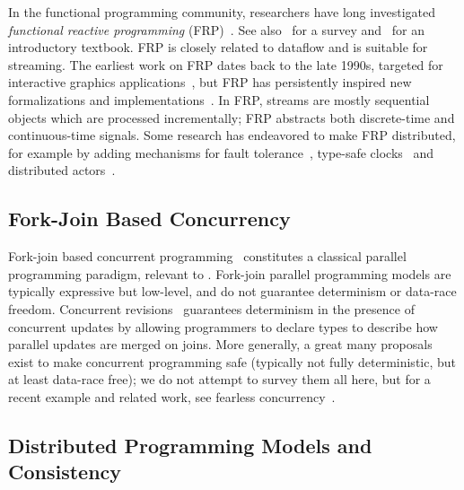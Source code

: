 In the functional programming community, researchers have long investigated
\emph{functional reactive programming} (FRP)~\cite{wan2000functional,nilsson2002functional}.
See also~\cite{bainomugisha2013survey} for a survey and~\cite{blackheath2016functional} for an introductory textbook.
FRP is closely related to dataflow and is suitable for streaming.
The earliest work on FRP dates back to the late 1990s, targeted for interactive graphics applications~\cite{elliott1997functional,elliott1997modeling},
but FRP has persistently inspired new formalizations and implementations~\cite{courtney2001frappe,cooper2006embedding,foster2011frenetic,perez2016functional}.
In FRP, streams are mostly sequential objects which are processed incrementally; FRP abstracts both discrete-time and continuous-time signals.
Some research has endeavored to make FRP distributed,
for example by adding mechanisms for
fault tolerance~\cite{perez2020fault},
type-safe clocks~\cite{barenz2018rhine}
and distributed actors~\cite{shibanai2018distributed}.

\subsection{Fork-Join Based Concurrency}

Fork-join based
concurrent programming~\cite{frigo1998implementation,lea2000java}
constitutes a classical parallel programming paradigm,
relevant to .
Fork-join parallel programming models are typically expressive but low-level, and do not guarantee determinism or data-race freedom.
Concurrent revisions~\cite{burckhardt2010concurrent}
guarantees determinism in the presence of concurrent updates
by allowing programmers to declare types to describe how parallel updates are merged on joins.
More generally, a great many proposals exist to make concurrent programming safe (typically not fully deterministic, but at least data-race free);
we do not attempt to survey them all here,
but for a recent example and related work, see fearless concurrency~\cite{milano2022flexible}.

\subsection{Distributed Programming Models and Consistency}

